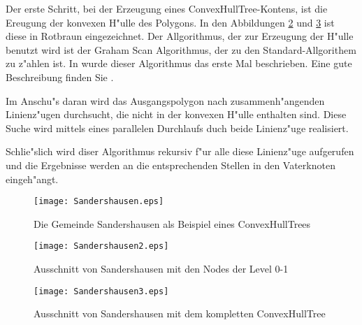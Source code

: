 Der erste Schritt, bei der Erzeugung eines ConvexHullTree-Kontens, ist die Ereugung der konvexen H"ulle des Polygons. In den Abbildungen \ref{fig:sand2} und \ref{fig:sanders3} ist diese in Rotbraun eingezeichnet. Der Allgorithmus, der zur Erzeugung der H"ulle benutzt wird ist der Graham Scan Algorithmus, der zu den Standard-Allgorithem zu z"ahlen ist. In \cite{G72} wurde dieser Algorithmus das erste Mal beschrieben. Eine gute Beschreibung finden Sie .

Im Anschu"s daran wird das Ausgangspolygon nach zusammenh"angenden Linienz"ugen durchsucht, die nicht in der konvexen H"ulle enthalten sind. Diese Suche wird mittels eines parallelen Durchlaufs duch beide Linienz"uge realisiert.

Schlie"slich wird diser Algorithmus rekursiv f"ur alle diese Linienz"uge aufgerufen und die Ergebnisse werden an die entsprechenden Stellen in den Vaterknoten eingeh"angt.

\begin{figure}
	\centering
	\texttt{[image: Sandershausen.eps]}
	\caption{Die Gemeinde Sandershausen als Beispiel eines ConvexHullTrees}
	\label{fig:Sanders}
\end{figure}
\begin{figure}
	\centering
	\texttt{[image: Sandershausen2.eps]}
	\caption{Ausschnitt von Sandershausen mit den Nodes der Level 0-1}
	\label{fig:sand2}
\end{figure}
\begin{figure}
	\centering
	\texttt{[image: Sandershausen3.eps]}
	\caption{Ausschnitt von Sandershausen mit dem kompletten ConvexHullTree}
	\label{fig:sanders3}
\end{figure}

